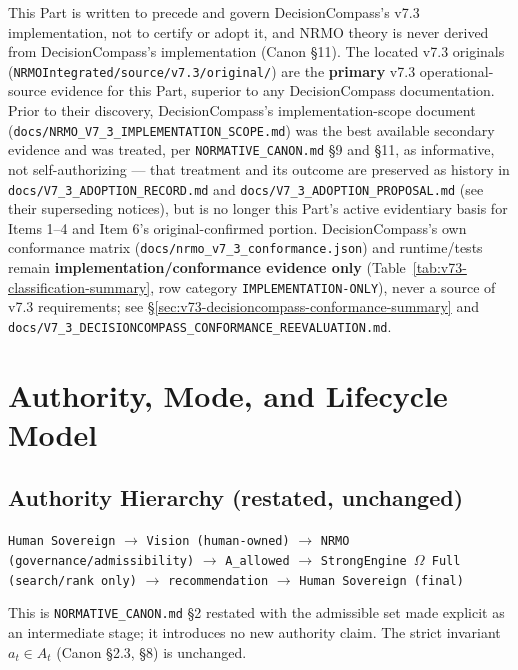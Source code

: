 This Part is written to precede and govern DecisionCompass's v7.3
implementation, not to certify or adopt it, and NRMO theory is never
derived from DecisionCompass's implementation (Canon \S11). The located
v7.3 originals (\texttt{NRMOIntegrated/source/v7.3/original/}) are the
\textbf{primary} v7.3 operational-source evidence for this Part, superior
to any DecisionCompass documentation. Prior to their discovery,
DecisionCompass's implementation-scope document
(\texttt{docs/NRMO\_V7\_3\_IMPLEMENTATION\_SCOPE.md}) was the best
available secondary evidence and was treated, per
\texttt{NORMATIVE\_CANON.md} \S9 and \S11, as informative, not
self-authorizing --- that treatment and its outcome are preserved as
history in \texttt{docs/V7\_3\_ADOPTION\_RECORD.md} and
\texttt{docs/V7\_3\_ADOPTION\_PROPOSAL.md} (see their superseding
notices), but is no longer this Part's active evidentiary basis for
Items 1--4 and Item 6's original-confirmed portion. DecisionCompass's
own conformance matrix (\texttt{docs/nrmo\_v7\_3\_conformance.json}) and
runtime/tests remain \textbf{implementation/conformance evidence only}
(Table~\ref{tab:v73-classification-summary}, row category
\texttt{IMPLEMENTATION-ONLY}), never a source of v7.3 requirements; see
\S\ref{sec:v73-decisioncompass-conformance-summary} and
\texttt{docs/V7\_3\_DECISIONCOMPASS\_CONFORMANCE\_REEVALUATION.md}.

\chapter{Authority, Mode, and Lifecycle Model}
\label{ch:v73-authority-mode}

\section{Authority Hierarchy (restated, unchanged)}
\label{sec:v73-authority}

\begin{center}
\texttt{Human Sovereign} $\to$ \texttt{Vision (human-owned)} $\to$
\texttt{NRMO (governance/admissibility)} $\to$ \texttt{A\_allowed} $\to$
\texttt{StrongEngine \(\Omega\) Full (search/rank only)} $\to$
\texttt{recommendation} $\to$ \texttt{Human Sovereign (final)}
\end{center}

This is \texttt{NORMATIVE\_CANON.md} \S2 restated with the admissible
set made explicit as an intermediate stage; it introduces no new
authority claim. The strict invariant
$a_t \in A_t$ (Canon \S2.3, \S8) is unchanged.


